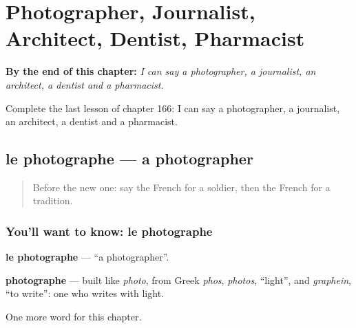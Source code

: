 
\chapter{Photographer, Journalist, Architect, Dentist, Pharmacist}
\label{ch:fr-photographer-journalist-architect-dentist-pharmacist}

\begin{chapteropening}
\textbf{By the end of this chapter:} \emph{I can say a photographer, a journalist, an architect, a dentist and a pharmacist.}

Complete the last lesson of chapter 166: I can say a photographer, a journalist, an architect, a dentist and a pharmacist.
\end{chapteropening}

\section[le photographe]{le photographe — a photographer}

\label{lesson:FR-C166-photographe}



\begin{quote}
Before the new one: say the French for a soldier, then the French for a tradition.
\end{quote}

\subsection*{You'll want to know: le photographe}
\textbf{le photographe} — \textquotedblleft{}a photographer\textquotedblright{}.

\begin{cousinweb}
\textbf{photographe} — built like \emph{photo}, from Greek \emph{phos}, \emph{photos}, \textquotedblleft{}light\textquotedblright{}, and \emph{graphein}, \textquotedblleft{}to write\textquotedblright{}: one who writes with light.
\end{cousinweb}

\begin{grammarlens}[title={What you've built}]
One more word for this chapter.
\end{grammarlens}

